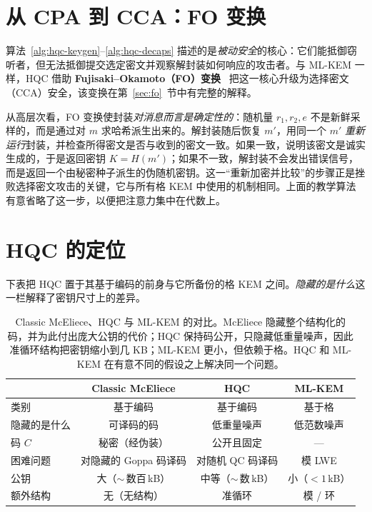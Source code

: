 \section{从 CPA 到 CCA：FO 变换}

算法~\ref{alg:hqc-keygen}--\ref{alg:hqc-decaps} 描述的是\emph{被动安全}的核心：它们能抵御窃听者，但无法抵御提交选定密文并观察解封装如何响应的攻击者。与 ML-KEM 一样，HQC 借助 \textbf{Fujisaki--Okamoto（FO）变换}~\cite{fo1999} 把这一核心升级为选择密文（CCA）安全，该变换在第~\ref{sec:fo}~节中有完整的解释。

从高层次看，FO 变换使封装\emph{对消息而言是确定性的}：随机量 $r_1, r_2, e$ 不是新鲜采样的，而是通过对 $m$ 求哈希派生出来的。解封装随后恢复 $m'$，用同一个 $m'$ \emph{重新运行}封装，并检查所得密文是否与收到的密文一致。如果一致，说明该密文是诚实生成的，于是返回密钥 $K = H(m')$；如果不一致，解封装不会发出错误信号，而是返回一个由秘密种子派生的伪随机密钥。这一“重新加密并比较”的步骤正是挫败选择密文攻击的关键，它与所有格 KEM 中使用的机制相同。上面的教学算法有意省略了这一步，以便把注意力集中在代数上。

\section{HQC 的定位}

下表把 HQC 置于其基于编码的前身与它所备份的格 KEM 之间。\emph{隐藏的是什么}这一栏解释了密钥尺寸上的差异。

\begin{table}[H]
\centering
\begin{tabular}{lccc}
\toprule
 & Classic McEliece & HQC & ML-KEM \\
\midrule
类别        & 基于编码        & 基于编码            & 基于格 \\
隐藏的是什么 & 可译码的码 & 低重量噪声      & 低范数噪声 \\
码 $C$   & 秘密（经伪装） & 公开且固定      & --- \\
困难问题   & 对隐藏的 Goppa 码译码 & 对随机 QC 码译码 & 模 LWE \\
公钥     & 大（$\sim$\,数百\,kB） & 中等（$\sim$\,数\,kB） & 小（$<1$\,kB） \\
额外结构 & 无（无结构）  & 准循环          & 模 / 环 \\
\bottomrule
\end{tabular}
\caption{Classic McEliece、HQC 与 ML-KEM 的对比。McEliece 隐藏整个结构化的码，并为此付出庞大公钥的代价；HQC 保持码公开，只隐藏低重量噪声，因此准循环结构把密钥缩小到几 KB；ML-KEM 更小，但依赖于格。HQC 和 ML-KEM 在有意不同的假设之上解决同一个问题。}
\label{tab:hqc-comparison}
\end{table}


